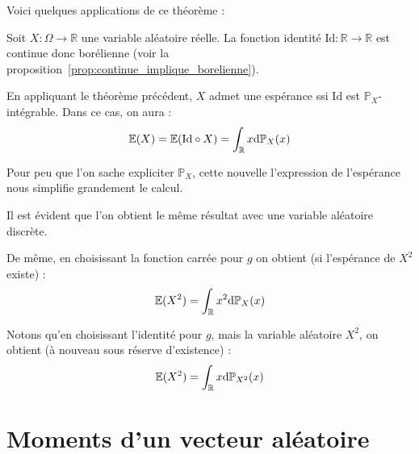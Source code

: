 \documentclass[../integ-proba.tex]{subfiles}
\begin{document}
    Voici quelques applications de ce théorème :

    \begin{exemple}
        Soit $X:\Omega \longrightarrow \mathbb{R}$ une variable aléatoire réelle.
        La fonction identité $\text{Id}:\mathbb{R} \longrightarrow \mathbb{R}$ est continue donc borélienne (voir la proposition~\ref{prop:continue_implique_borelienne}).

        En appliquant le théorème précédent, $X$ admet une espérance ssi $\text{Id}$ est $\mathbb{P}_X$-intégrable.
        Dans ce cas, on aura :
        \begin{displaymath}
            \mathbb{E}(X) = \mathbb{E}(\text{Id} \circ X) = \int_\mathbb{R} x\textnormal{d}\mathbb{P}_X(x)
        \end{displaymath}

        Pour peu que l'on sache expliciter $\mathbb{P}_X$, cette nouvelle l'expression de l'espérance nous simplifie grandement le calcul.

        Il est évident que l'on obtient le même résultat avec une variable aléatoire discrète.
    \end{exemple}

    \begin{exemple}
        De même, en choisissant la fonction carrée pour $g$ on obtient (si l'espérance de $X^2$ existe) :
        \begin{displaymath}
            \mathbb{E}(X^2) = \int_\mathbb{R} x^2\textnormal{d}\mathbb{P}_X(x)
        \end{displaymath}

        Notons qu'en choisissant l'identité pour $g$, mais la variable aléatoire $X^2$, on obtient (à nouveau sous réserve d'existence) :
        \begin{displaymath}
            \mathbb{E}(X^2) = \int_\mathbb{R} x\textnormal{d}\mathbb{P}_{X^2}(x)
        \end{displaymath}
    \end{exemple}

    \section{Moments d'un vecteur aléatoire}
\end{document}
